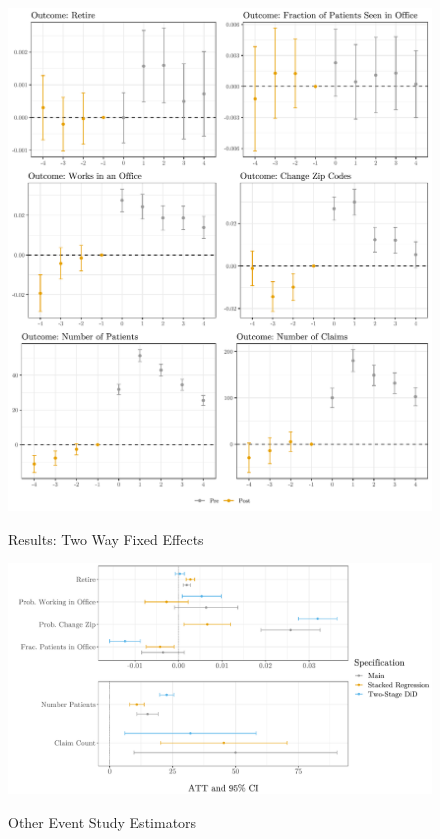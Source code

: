 \documentclass[11pt]{article}
\begin{document}
\begin{figure}
    \centering
    \caption{Results: Two Way Fixed Effects}
    \includegraphics[scale=.8]{Objects/twfe_plot.pdf}
    \label{fig:twfe}
\end{figure}

\begin{figure}[ht]
    \centering
    \caption{Other Event Study Estimators}
    \includegraphics[scale=.57]{Objects/estimators_graph.pdf}
    \label{fig:esimators}
\end{figure}
\end{document}
